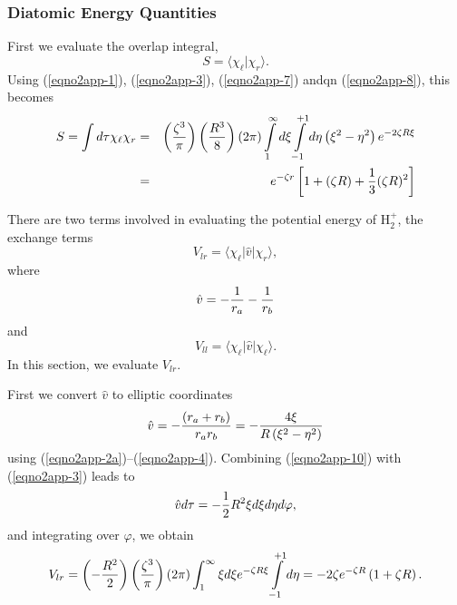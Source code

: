 \subsubsection{Diatomic Energy Quantities}

First we evaluate the overlap integral,
\begin{equation}
S = \langle \chi_\ell \vert \chi_r \rangle .
\end{equation}
Using (\ref{eqno2app-1}), (\ref{eqno2app-3}), (\ref{eqno2app-7}) andqn
(\ref{eqno2app-8}), this becomes
\begin{eqnarray}
S = \int d \tau \chi_\ell \chi_r &=& \left( {\zeta^3 \over \pi} \right) 
\left( {R^3 \over 8} \right) ( 2 \pi ) \int\limits^{\infty}_{1} d 
\xi \int\limits^{+1}_{-1} d \eta \left( \xi^2 - \eta^2 \right) e^{-2 
\zeta R \xi}\cr
&=& e^{- \zeta r} \left[ 1 + ( \zeta R ) + {1 \over 3} ( \zeta R )^2 
\right]
\label{eqno2app-9}
\end{eqnarray}

There are two terms involved in evaluating the potential energy of 
H$^+_2$, the  exchange terms
\begin{equation}
V_{lr} = \langle \chi_\ell \vert {\hat v} \vert \chi_r \rangle ,
\end{equation}
where
\begin{equation}
{\hat v} = - {1 \over r_a} - {1 \over r_b}
\end{equation}
and
\begin{equation}
V_{ll} = \langle \chi_\ell \vert {\hat{v}} \vert \chi_\ell \rangle .
\end{equation}
In this section, we evaluate $V_{lr}$.
    
First we convert ${\hat{v}}$ to elliptic coordinates
\begin{equation}
{\hat v} = - {\left( r_a + r_b \right) \over r_ar_b} = - {4 \xi \over 
R \left( \xi^2 - \eta^2 \right)}
\label{eqno2app-10}
\end{equation}
using (\ref{eqno2app-2a})--(\ref{eqno2app-4}). Combining 
(\ref{eqno2app-10}) with (\ref{eqno2app-3}) leads to
\begin{equation}
{\hat v} d \tau = - {1 \over 2} R^2 \xi d \xi d \eta d \varphi ,
\end{equation}
and integrating over $\varphi$, we obtain
\begin{equation}
V_{lr} = \left( - {R^2 \over 2} \right) \left( {\zeta^3 \over \pi} 
\right) ( 2 \pi ) \int^{\infty}_{1} \xi d\xi e^{- \zeta 
R \xi} \int\limits^{+1}_{-1} d \eta = - 2 \zeta e^{-\zeta R} \left( 
1 + \zeta R \right) .
\end{equation}
 
